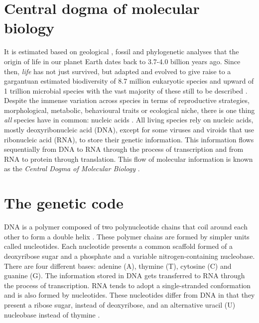 \section{Central dogma of molecular biology}

It is estimated based on geological \cite{SCHIDLOWSKI_1979_LIFE}, fossil \cite{SCHOPF_2007_LIFE} and phylogenetic \cite{BETTS_2018_LIFE} analyses that the origin of life in our planet Earth dates back to 3.7-4.0 billion years ago. Since then, \textit{life} has not just survived, but adapted and evolved to give raise to a gargantuan estimated biodiversity of 8.7 million eukaryotic species \cite{MORA_2011_SPECIES} and upward of 1 trillion microbial species \cite{HUG_2016_SPECIES, LOCEY_2016_SPECIES} with the vast majority of these still to be described \cite{COSTELLO_2013_SPECIES}. Despite the immense variation across species in terms of reproductive strategies, morphological, metabolic, behavioural traits or ecological niche, there is one thing \textit{all} species have in common: nucleic acids \cite{KOONIN_2011_LIFE}. All living species rely on nucleic acids, mostly deoxyribonucleic acid (DNA), except for some viruses \cite{KOONIN_2006_VIRUS} and viroids \cite{NAVARRO_2021_VIROIDS} that use ribonucleic acid (RNA), to store their genetic information. This information flows sequentially from DNA to RNA through the process of transcription and from RNA to protein through translation. This flow of molecular information is known as the \textit{Central Dogma of Molecular Biology} \cite{CRICK_1958_DOGMA, CRICK_1970_DOGMA}.

\section{The genetic code}

DNA is a polymer composed of two polynucleotide chains that coil around each other to form a double helix \cite{WATSON_1953_DNA}. These polymer chains are formed by simpler units called nucleotides. Each nucleotide presents a common scaffold formed of a deoxyribose sugar and a phosphate and a variable nitrogen-containing nucleobase. There are four different bases: adenine (A), thymine (T), cytosine (C) and guanine (G). The information stored in DNA gets transferred to RNA through the process of transcription. RNA tends to adopt a single-stranded conformation and is also formed by nucleotides. These nucleotides differ from DNA in that they present a ribose sugar, instead of deoxyribose, and an alternative uracil (U) nucleobase instead of thymine \cite{LEVENE_1909_NUCLEICS}.

